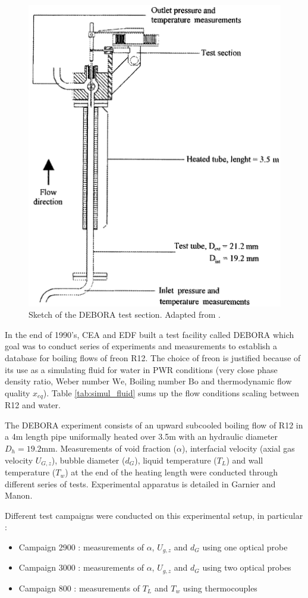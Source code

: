 \begin{figure}[!h]
\centering
\includegraphics[width=0.5\linewidth]{img/DEBORA/debora_sketch.png}
\caption{Sketch of the DEBORA test section. Adapted from \cite{garnier_local_2001}.}
\label{fig:sketch_debora}
\end{figure}






In the end of 1990's, CEA and EDF built a test facility called DEBORA which goal was to conduct series of experiments and measurements to establish a database for boiling flows of freon R12. The choice of freon is justified because of its use as a simulating fluid for water in PWR conditions (very close phase density ratio, Weber number $\text{We}$, Boiling number $\text{Bo}$ and thermodynamic flow quality $x_{eq}$). Table \ref{tab:simul_fluid} sums up the flow conditions scaling between R12 and water.



The DEBORA experiment consists of an upward subcooled boiling flow of R12 in a 4m length pipe uniformally heated over 3.5m with an hydraulic diameter $D_{h}=19.2\text{mm}$. Measurements of void fraction ($\alpha$), interfacial velocity (\ie axial gas velocity $U_{G,z}$), bubble diameter ($d_{G}$), liquid temperature ($T_{L}$) and wall temperature ($T_{w}$) at the end of the heating length were conducted through different series of tests. Experimental apparatus is detailed in {Garnier} \etal\cite{Garnier2001} and {Manon}\cite{Manon2000}.

Different test campaigns were conducted on this experimental setup, in particular :

\begin{itemize}
\item Campaign 2900 : measurements of $\alpha$, $U_{g,z}$ and $d_{G}$ using one optical probe
\item Campaign 3000 : measurements of $\alpha$, $U_{g,z}$ and $d_{G}$ using two optical probes 
\item Campaign 800 : measurements of $T_{L}$ and $T_{w}$ using thermocouples
\end{itemize}

